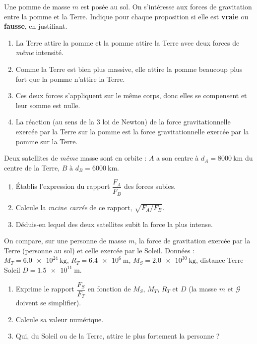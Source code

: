 \documentclass[11pt,a4paper]{article}
\begin{document}

\begin{exo}
Une pomme de masse $m$ est posée au sol. On s'intéresse aux forces de gravitation
entre la pomme et la Terre. Indique pour chaque proposition si elle est
\textbf{vraie} ou \textbf{fausse}, en justifiant.
\begin{enumerate}[label=\alph*)]
  \item La Terre attire la pomme et la pomme attire la Terre avec deux forces de
        \emph{même} intensité.
  \item Comme la Terre est bien plus massive, elle attire la pomme beaucoup plus fort
        que la pomme n'attire la Terre.
  \item Ces deux forces s'appliquent sur le même corps, donc elles se compensent et
        leur somme est nulle.
  \item La réaction (au sens de la 3 loi de Newton) de la force gravitationnelle
        exercée par la Terre sur la pomme est la force gravitationnelle exercée par la
        pomme sur la Terre.
\end{enumerate}
\end{exo}

\begin{exo}
Deux satellites de \emph{même} masse sont en orbite : $A$ a son centre à
$d_A=\qty{8000}{\kilo\metre}$ du centre de la Terre, $B$ à $d_B=\qty{6000}{\kilo\metre}$.
\begin{enumerate}[label=\alph*)]
  \item Établis l'expression du rapport $\dfrac{F_A}{F_B}$ des forces subies.
  \item Calcule la \emph{racine carrée} de ce rapport, $\sqrt{F_A/F_B}$.
  \item Déduis-en lequel des deux satellites subit la force la plus intense.
\end{enumerate}
\end{exo}

\begin{exo}
On compare, sur une personne de masse $m$, la force de gravitation exercée par la
Terre (personne au sol) et celle exercée par le Soleil. Données :
$M_T=\qty{6.0e24}{\kilogram}$, $R_T=\qty{6.4e6}{\metre}$,
$M_S=\qty{2.0e30}{\kilogram}$, distance Terre--Soleil $D=\qty{1.5e11}{\metre}$.
\begin{enumerate}[label=\alph*)]
  \item Exprime le rapport $\dfrac{F_S}{F_T}$ en fonction de $M_S$, $M_T$, $R_T$ et $D$
        (la masse $m$ et $\mathcal{G}$ doivent se simplifier).
  \item Calcule sa valeur numérique.
  \item Qui, du Soleil ou de la Terre, attire le plus fortement la personne ?
\end{enumerate}
\end{exo}
\end{document}
